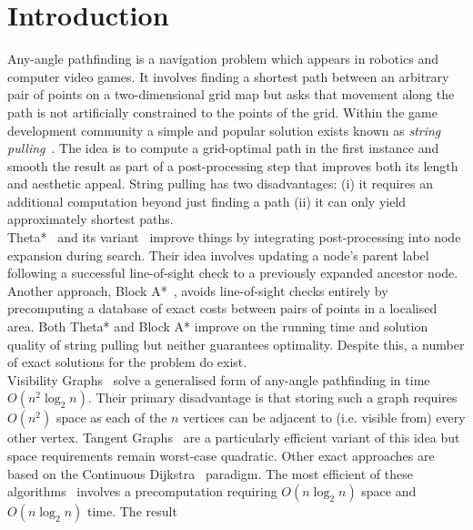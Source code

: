 \section{Introduction}
\label{cha::anya::intro}
Any-angle pathfinding is a navigation problem which appears in robotics
and computer video games. It involves finding a shortest path between an 
arbitrary pair of points on a two-dimensional grid map but asks that 
movement along the path is not artificially constrained to the points of 
the grid.  Within the game development community a simple and popular 
solution exists known as \emph{string pulling}~\citep{pinter01,botea04}.
The idea is to compute a grid-optimal path in the first
instance and smooth the result as part of a post-processing step that improves
both its length and aesthetic appeal. String pulling has two disadvantages: 
(i) it requires an additional computation beyond just finding a path (ii)
it can only yield approximately shortest paths.
\\
Theta*~\citep{nash07} and its variant~\citep{%
nash10} improve things 
by integrating post-processing into node expansion during search. Their 
idea involves updating a node's parent label following a successful line-of-sight
check to a previously expanded ancestor node.
Another approach, Block A*~\citep{yap11}, avoids line-of-sight checks entirely 
by precomputing a database of exact costs between pairs of points in a localised area.
Both Theta* and Block A* improve on the running time and 
solution quality of string pulling but neither guarantees optimality.
Despite this, a number of exact solutions for the problem do exist.
\\
Visibility Graphs~\citep{lozanoperez79} solve a generalised form of 
any-angle pathfinding in time $O(n^2\log_{2}n)$. Their primary disadvantage
is that storing such a graph requires $O(n^2)$ space as each of the $n$ 
vertices can be adjacent to (i.e. visible from) every other vertex.  
Tangent Graphs~\citep{liu92} are a particularly efficient 
variant of this idea but space requirements remain worst-case quadratic. 
Other exact approaches are based on the 
Continuous Dijkstra~\citep{mitchell87} paradigm.
The most efficient of these algorithms~\citep{hershberger99} involves a
precomputation requiring $O(n \log_{2}{n})$ space and $O(n\log_{2}n)$ time.  The result 
